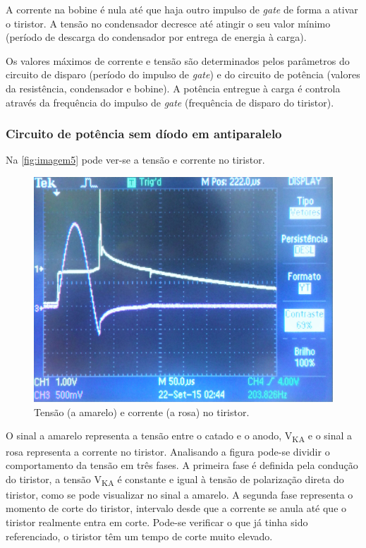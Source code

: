 \documentclass[a4paper,11pt]{article}
\numberwithin{equation}{section}
\begin{document}
	A corrente na bobine é nula até que haja outro impulso de \textit{gate} de forma a ativar o tiristor. A tensão no condensador decresce até atingir o seu valor mínimo (período de descarga do condensador por entrega de energia à carga).
	
	Os valores máximos de corrente e tensão são determinados pelos parâmetros do circuito de disparo (período do impulso de \textit{gate}) e do circuito de potência (valores da resistência, condensador e bobine).
	A potência entregue à carga é controla através da frequência  do impulso de \textit{gate} (frequência de disparo do tiristor).


\subsubsection{Circuito de potência sem díodo em antiparalelo}
Na \autoref{fig:imagem5} pode ver-se a tensão e corrente no tiristor.

\begin{figure}[h]
	\centering
	\includegraphics[keepaspectratio=true, scale=0.165]{img/imagem5}
	\caption{Tensão (a amarelo) e corrente (a rosa) no tiristor.}
	\label{fig:imagem5}
	\vspace{-0.8em}
\end{figure}
O sinal a amarelo representa a tensão entre o catado e o anodo, V\textsubscript{KA} e o sinal a rosa representa a corrente no tiristor.
Analisando a figura pode-se dividir o comportamento da tensão em três fases. A primeira fase é definida pela condução do tiristor, a tensão V\textsubscript{KA} é constante e igual à tensão de polarização direta do tiristor, como se pode visualizar no sinal a amarelo. 
A segunda fase representa o momento de corte do tiristor, intervalo desde que a corrente se anula até que o tiristor realmente entra em corte. Pode-se verificar o que já tinha sido referenciado, o tiristor têm um tempo de corte muito elevado. 
\end{document}
